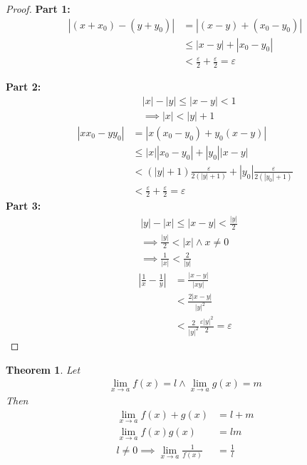 \documentclass{article}
\newtheorem{theorem}{Theorem}[section]
\begin{document}
\begin{proof}
\textbf{Part 1:}
\begin{align*}
        |(x+x_0)-(y+y_0)| &= |(x-y)+(x_0-y_0)| \\
                      &\leq |x-y|+|x_0-y_0| \\ &<
                      \frac{\varepsilon}{2}+\frac{\varepsilon}{2}
                      = \varepsilon
\end{align*}

\textbf{Part 2:}
\begin{align*}
    &|x| - |y| \leq |x-y| < 1  \\
    &\implies |x| < |y|+1 
\end{align*}
\begin{align*}
    |xx_0-yy_0| &= |x(x_0-y_0)+y_0(x-y)| \\
                &\leq |x||x_0-y_0| + |y_0||x-y| \\ 
				&< (|y|+1)\frac{\varepsilon}{2(|y|+1)} +
                |y_0|\frac{\varepsilon}{2(|y_0|+1)} \\ 
				&< \frac{\varepsilon}{2} + \frac{\varepsilon}{2} 
				= \varepsilon
\end{align*}
\textbf{Part 3:}
\begin{align*}
    &|y|-|x| \leq |x-y| < \frac{|y|}{2} \\
    &\implies \frac{|y|}{2} < |x| \land x \neq 0 \\
    &\implies \frac{1}{|x|} < \frac{2}{|y|}
\end{align*}
\begin{align}
    \left| \frac{1}{x} - 
	\frac{1}{y}\right| &= \frac{|x-y|}{|xy|} \\
                       &< \frac{2|x-y|}{|y|^2}\\
                       &< \frac{2}{|y|^2} \frac{\varepsilon |y|^2}{2}
					   = \varepsilon
\end{align}
\end{proof}
\begin{theorem}
Let
\begin{align*}
    \lim_{x \rightarrow a} f(x) = l \land \lim_{x \rightarrow a} g(x) = m
\end{align*}
Then
\begin{align*}
	\lim_{x \rightarrow a} f(x) + g(x) &= l + m \\
	\lim_{x \rightarrow a} f(x)g(x) &= lm \\
	l \neq 0 \implies \lim_{x \rightarrow a} \frac{1}{f(x)} &= \frac{1}{l} \\
\end{align*}
\end{theorem}
\end{document}
